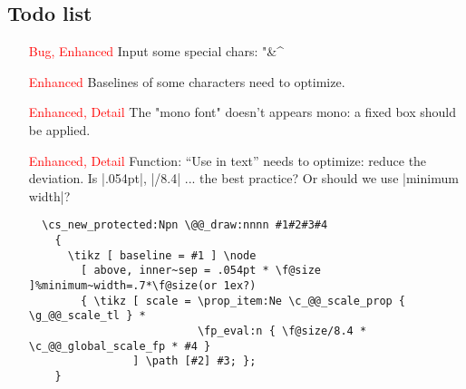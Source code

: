 \documentclass[lm-default]{l3doc}
\begin{document}
\begin{documentation}
\section{Todo list}

\begin{itemize}
  \item [\textcolor{red}{\textsf{Bug, Enhanced}}] Input some special chars:
  "&^%
  \item [\textcolor{red}{\textsf{Enhanced}}] Baselines of some characters need to optimize.
  \item [\textcolor{red}{\textsf{Enhanced, Detail}}] The "mono font" doesn't
  appears mono: a fixed box should be applied.
  \item [\textcolor{red}{\textsf{Enhanced, Detail}}] Function: ``Use in text'' needs to optimize: reduce the deviation.
  Is |.054pt|, |\f@size/8.4| ... the best practice? Or should we use |minimum width|?
  \begin{verbatim}
  \cs_new_protected:Npn \@@_draw:nnnn #1#2#3#4
    {
      \tikz [ baseline = #1 ] \node
        [ above, inner~sep = .054pt * \f@size ]%minimum~width=.7*\f@size(or 1ex?)
        { \tikz [ scale = \prop_item:Ne \c_@@_scale_prop { \g_@@_scale_tl } *
                          \fp_eval:n { \f@size/8.4 * \c_@@_global_scale_fp * #4 }
                ] \path [#2] #3; };
    }
  \end{verbatim}
\end{itemize}

\end{documentation}

\begin{implementation}

\end{implementation}

\end{document}
